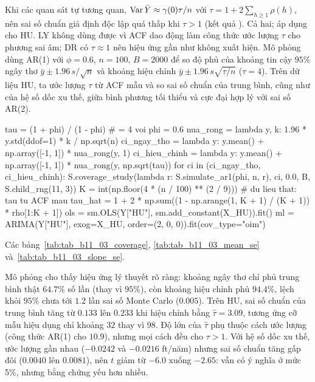  Khi các quan sát tự tương quan, $\operatorname{Var}\bar Y\approx\gamma(0)\tau/n$ với $\tau=1+2\sum_{h\ge1}\rho(h)$, nên sai số chuẩn giả định độc lập quá thấp khi $\tau>1$ (kết quả ).
 Cả hai; áp dụng cho HU. LY không dùng được vì ACF dao động làm công thức ước lượng $\tau$ cho phương sai âm; DR có $\tau\approx1$ nên hiệu ứng gần như không xuất hiện. Mô phỏng dùng AR(1) với $\phi=0.6$, $n=100$, $B=2000$ để so độ phủ của khoảng tin cậy $95\%$ ngây thơ $\bar y\pm1.96\,s/\sqrt n$ và khoảng hiệu chỉnh $\bar y\pm1.96\,s\sqrt{\tau/n}$ ($\tau=4$). Trên dữ liệu HU, ta ước lượng $\tau$ từ ACF mẫu và so sai số chuẩn của trung bình, cũng như của hệ số dốc xu thế, giữa bình phương tối thiểu và cực đại hợp lý với sai số AR(2).
\begin{codeblock}
tau = (1 + phi) / (1 - phi)                                    # = 4 voi phi = 0.6
nua_rong = lambda y, k: 1.96 * y.std(ddof=1) * k / np.sqrt(n)
ci_ngay_tho = lambda y: y.mean() + np.array([-1, 1]) * nua_rong(y, 1)
ci_hieu_chinh = lambda y: y.mean() + np.array([-1, 1]) * nua_rong(y, np.sqrt(tau))
for ci in (ci_ngay_tho, ci_hieu_chinh):
    S.coverage_study(lambda r: S.simulate_ar1(phi, n, r), ci, 0.0, B, S.child_rng(11, 3))
K = int(np.floor(4 * (n / 100) ** (2 / 9)))                    # du lieu that: tau tu ACF mau
tau_hat = 1 + 2 * np.sum((1 - np.arange(1, K + 1) / (K + 1)) * rho[1:K + 1])
ols = sm.OLS(Y["HU"], sm.add_constant(X_HU)).fit()
ml = ARIMA(Y["HU"], exog=X_HU, order=(2, 0, 0)).fit(cov_type="oim")
\end{codeblock}
 Các bảng~\ref{tab:tab_b11_03_coverage}, \ref{tab:tab_b11_03_mean_se} và~\ref{tab:tab_b11_03_slope_se}.



 Mô phỏng cho thấy hiệu ứng lý thuyết rõ ràng: khoảng ngây thơ chỉ phủ trung bình thật $64.7\%$ số lần (thay vì $95\%$), còn khoảng hiệu chỉnh phủ $94.4\%$, lệch khỏi $95\%$ chưa tới $1.2$ lần sai số Monte Carlo ($0.005$). Trên HU, sai số chuẩn của trung bình tăng từ $0.133$ lên $0.233$ khi hiệu chỉnh bằng $\hat\tau=3.09$, tương ứng cỡ mẫu hiệu dụng chỉ khoảng $32$ thay vì $98$. Độ lớn của $\hat\tau$ phụ thuộc cách ước lượng (công thức AR(1) cho $10.9$), nhưng mọi cách đều cho $\tau>1$. Với hệ số dốc xu thế, ước lượng gần nhau ($-0.0242$ và $-0.0216$ ft/năm) nhưng sai số chuẩn tăng gấp đôi ($0.0040$ lên $0.0081$), nên $t$ giảm từ $-6.0$ xuống $-2.65$: vẫn có ý nghĩa ở mức 5\%, nhưng bằng chứng yếu hơn nhiều.

